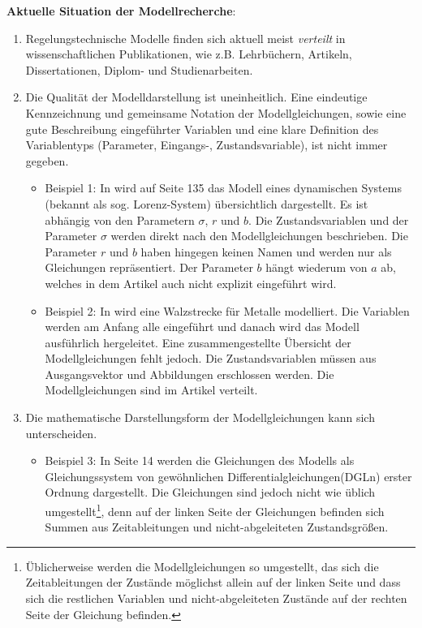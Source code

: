 \textbf{Aktuelle Situation der Modellrecherche}: 
\begin{enumerate}
	\item Regelungstechnische Modelle finden sich aktuell meist \textit{verteilt} in wissenschaftlichen Publikationen, wie z.B. Lehrbüchern, Artikeln, Dissertationen, Diplom- und Studienarbeiten.
	\item Die Qualität der Modelldarstellung ist uneinheitlich. Eine eindeutige Kennzeichnung und gemeinsame Notation der Modellgleichungen, sowie eine gute Beschreibung eingeführter Variablen und eine klare Definition des Variablentyps (Parameter, Eingangs-, Zustandsvariable), ist nicht immer gegeben.
	\begin{itemize}[label=$\bullet$]
		\item Beispiel 1: In \cite{LOR63} wird auf Seite 135 das Modell eines dynamischen Systems (bekannt als sog. \glqq Lorenz-System\grqq) übersichtlich dargestellt. Es ist abhängig von den Parametern $\sigma$, $r$ und $b$. Die Zustandsvariablen und der Parameter $\sigma$ werden direkt nach den Modellgleichungen beschrieben. Die Parameter $r$ und $b$ haben hingegen keinen Namen und werden nur als Gleichungen repräsentiert. Der Parameter $b$ hängt wiederum von $a$ ab, welches in dem Artikel auch nicht explizit eingeführt wird.
		\item Beispiel 2: In \cite{YIFREA09} wird eine Walzstrecke für Metalle modelliert. Die Variablen werden am Anfang alle eingeführt und danach wird das Modell ausführlich hergeleitet. Eine zusammengestellte Übersicht der Modellgleichungen fehlt jedoch. Die Zustandsvariablen müssen aus Ausgangsvektor und Abbildungen erschlossen werden. Die Modellgleichungen sind im Artikel verteilt.
	\end{itemize}
	\item Die mathematische Darstellungsform der Modellgleichungen kann sich unterscheiden.
	\begin{itemize}[label=$\bullet$]
		\item Beispiel 3: In \cite{SILEEA12} Seite 14 werden die Gleichungen des Modells als Gleichungssystem von gewöhnlichen Differentialgleichungen(DGLn) erster Ordnung dargestellt. Die Gleichungen sind jedoch nicht wie üblich umgestellt\footnote{Üblicherweise werden die Modellgleichungen so umgestellt, das sich die Zeitableitungen der Zustände möglichst allein auf der linken Seite und dass sich die restlichen Variablen und nicht-abgeleiteten Zustände auf der rechten Seite der Gleichung befinden.}, denn auf der linken Seite der Gleichungen befinden sich Summen aus Zeitableitungen und nicht-abgeleiteten Zustandsgrößen.

\end{itemize}
\end{enumerate}
